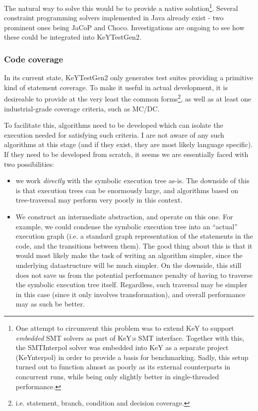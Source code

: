 \documentclass{article}
\newcommand{\tmem}[1]{{\em #1\/}}
\newenvironment{itemizedot}{\begin{itemize} \renewcommand{\labelitemi}{$\bullet$}\renewcommand{\labelitemii}{$\bullet$}\renewcommand{\labelitemiii}{$\bullet$}\renewcommand{\labelitemiv}{$\bullet$}}{\end{itemize}}
\begin{document}
The natural way to solve this would be to provide a native
solution{\footnote{One attempt to circumvent this problem was to extend KeY to
support {\tmem{embedded}} SMT solvers as part of KeY:s SMT interface. Together
with this, the SMTInterpol solver was embedded into KeY as a separate project
(KeYnterpol) in order to provide a basis for benchmarking. Sadly, this setup
turned out to function almost as poorly as its external counterparts in
concurrent runs, while being only slightly better in single-threaded
performance.}}. Several constraint programming solvers implemented in Java
already exist - two prominent ones being JaCoP and Choco. Investigations are
ongoing to see how these could be integrated into KeYTestGen2.



\subsubsection{Code coverage}

\begin{flushleft}
  In its current state, KeYTestGen2 only generates test suites providing a
  primitive kind of statement coverage. To make it useful in actual
  development, it is desireable to provide at the very least the common
  forms{\footnote{i.e. statement, branch, condition and decision coverage.}},
  as well as at least one industrial-grade coverage criteria, such as MC/DC. 
\end{flushleft}



To facilitate this, algorithms need to be developed which can isolate the
execution needed for satisfying such criteria. I are not aware of any such
algorithms at this stage (and if they exist, they are most likely language
specific). If they need to be developed from scratch, it seems we are
essentially faced with two possibilities:
\begin{itemizedot}
  \item we work {\tmem{directly}} with the symbolic execution tree as-is. The
  downside of this is that execution trees can be enormously large, and
  algorithms based on tree-traversal may perform very poorly in this context.
  
  \item We construct an intermediate abstraction, and operate on this one. For
  example, we could condense the symbolic execution tree into an ``actual''
  execution graph (i.e. a standard graph representation of the statements in
  the code, and the transitions between them). The good thing about this is
  that it would most likely make the task of writing an algorithm simpler,
  since the underlying datastructure will be much simpler. On the downside,
  this still does not save us from the potential performance penalty of having
  to traverse the symbolic execution tree itself. Regardless, such traversal
  may be simpler in this case (since it only involves transformation), and
  overall performance may as such be better. 
\end{itemizedot}
\end{document}
